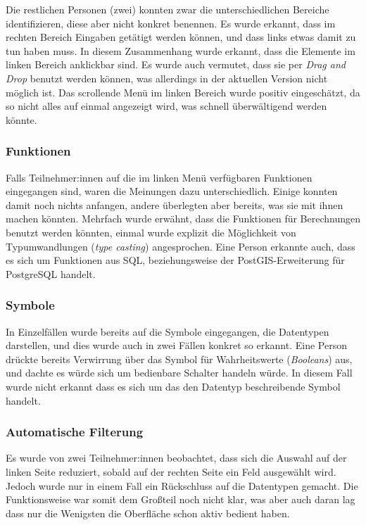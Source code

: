 Die restlichen Personen (zwei) konnten zwar die unterschiedlichen Bereiche identifizieren, diese aber nicht konkret benennen. Es wurde erkannt, dass im rechten Bereich Eingaben getätigt werden können, und dass links etwas damit zu tun haben muss. In diesem Zusammenhang wurde erkannt, dass die Elemente im linken Bereich anklickbar sind. Es wurde auch vermutet, dass sie per \textit{Drag and Drop} benutzt werden können, was allerdings in der aktuellen Version nicht möglich ist. Das scrollende Menü im linken Bereich wurde positiv eingeschätzt, da so nicht alles auf einmal angezeigt wird, was schnell überwältigend werden könnte.

\subsubsection{Funktionen}

Falls Teilnehmer:innen auf die im linken Menü verfügbaren Funktionen eingegangen sind, waren die Meinungen dazu unterschiedlich. Einige konnten damit noch nichts anfangen, andere überlegten aber bereits, was sie mit ihnen machen könnten. Mehrfach wurde erwähnt, dass die Funktionen für Berechnungen benutzt werden könnten, einmal wurde explizit die Möglichkeit von Typumwandlungen (\textit{type casting}) angesprochen. Eine Person erkannte auch, dass es sich um Funktionen aus SQL, beziehungsweise der PostGIS-Erweiterung für PostgreSQL handelt.

\subsubsection{Symbole}

In Einzelfällen wurde bereits auf die Symbole eingegangen, die Datentypen darstellen, und dies wurde auch in zwei Fällen konkret so erkannt. Eine Person drückte bereits Verwirrung über das Symbol für Wahrheitswerte (\textit{Booleans}) aus, und dachte es würde sich um bedienbare Schalter handeln würde. In diesem Fall wurde nicht erkannt dass es sich um das den Datentyp beschreibende Symbol handelt.

\subsubsection{Automatische Filterung}

Es wurde von zwei Teilnehmer:innen beobachtet, dass sich die Auswahl auf der linken Seite reduziert, sobald auf der rechten Seite ein Feld ausgewählt wird. Jedoch wurde nur in einem Fall ein Rückschluss auf die Datentypen gemacht. Die Funktionsweise war somit dem Großteil noch nicht klar, was aber auch daran lag dass nur die Wenigsten die Oberfläche schon aktiv bedient haben.

